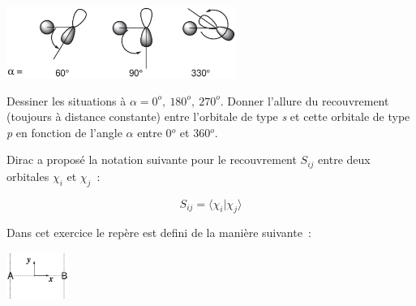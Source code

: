 \begin{enumerate}
\begin{enumerate}
\vspace{-0.3cm}
\begin{center}
\includegraphics[width=7.5cm]{figure/overlalpha.eps}
\end{center}

Dessiner les situations \`a $\alpha  = 0^o, \ 180^o, \  270^o$.
Donner l'allure du recouvrement (toujours \`a distance constante) entre l'orbitale de type
\textit{s} et cette orbitale de type \textit{p} en fonction de l'angle $\alpha$ entre 0$^o$ et 360$^o$.

\end{enumerate}
\end{enumerate}


Dirac a propos\'e la notation suivante pour le recouvrement $S_{ij}$ 
entre deux orbitales $\chi_i$ et $\chi_j$~:

\[
S_{ij} = \langle \chi_i | \chi_j \rangle
\]

Dans cet exercice le rep\`ere est defini de la mani\`ere suivante~:

\includegraphics[width=2cm]{figure/AB_repere_yx.eps}

